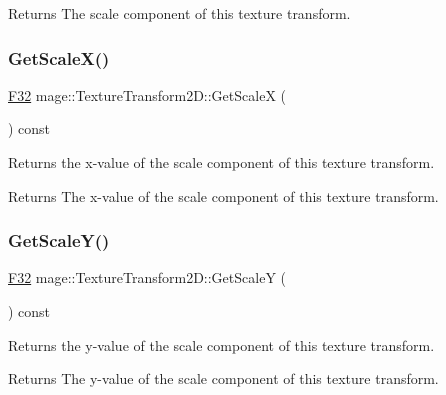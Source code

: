 \begin{DoxyReturn}{Returns}
The scale component of this texture transform. 
\end{DoxyReturn}
\mbox{\label{classmage_1_1_texture_transform2_d_a4fdfdbf70fbd437598b21c73f24a9ce4}} 
\subsubsection{\texorpdfstring{Get\+Scale\+X()}{GetScaleX()}}
{\footnotesize\ttfamily \mbox{\hyperlink{namespacemage_aa97e833b45f06d60a0a9c4fc22ae02c0}{F32}} mage\+::\+Texture\+Transform2\+D\+::\+Get\+ScaleX (\begin{DoxyParamCaption}{ }\end{DoxyParamCaption}) const\hspace{0.3cm}{\ttfamily [noexcept]}}

Returns the x-\/value of the scale component of this texture transform.

\begin{DoxyReturn}{Returns}
The x-\/value of the scale component of this texture transform. 
\end{DoxyReturn}
\mbox{\label{classmage_1_1_texture_transform2_d_aba1fc21e0b534a02fbad5ae1ee600d78}} 
\subsubsection{\texorpdfstring{Get\+Scale\+Y()}{GetScaleY()}}
{\footnotesize\ttfamily \mbox{\hyperlink{namespacemage_aa97e833b45f06d60a0a9c4fc22ae02c0}{F32}} mage\+::\+Texture\+Transform2\+D\+::\+Get\+ScaleY (\begin{DoxyParamCaption}{ }\end{DoxyParamCaption}) const\hspace{0.3cm}{\ttfamily [noexcept]}}

Returns the y-\/value of the scale component of this texture transform.

\begin{DoxyReturn}{Returns}
The y-\/value of the scale component of this texture transform. 
\end{DoxyReturn}
\mbox{\label{classmage_1_1_texture_transform2_d_ad872a2e22b213ac60df6a6d9548d6457}} 
